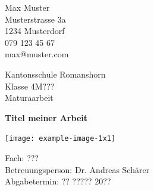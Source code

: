 \documentclass[a4paper,12pt,twoside]{article}
\begin{document}



\begin{titlepage}
	\clearpage\thispagestyle{empty}	
	
	\begin{minipage}[t]{\textwidth}
		\begin{minipage}[t]{0.5\textwidth}
			Max Muster\\
			Musterstrasse 3a\\
			1234 Musterdorf\\
			079 123 45 67\\
			max@muster.com
		\end{minipage}
		\begin{minipage}[t]{0.5\textwidth}
			\begin{flushright}
				Kantonsschule Romanshorn\\
				Klasse 4M???\\
				Maturaarbeit
			\end{flushright}
		\end{minipage}
	\end{minipage}
	
	\vspace{4cm}
	
	{
		\centering
		\Huge\bfseries Titel meiner Arbeit\par
		\vspace{1cm}
		\texttt{[image: example-image-1x1]}\par
	}
	
	\vspace{9cm}	
	\noindent
	Fach: ??? \noindent\\
	Betreuungsperson: Dr. Andreas Schärer\\
	Abgabetermin: ?? ????? 20??
	
\end{titlepage}


\end{document}
